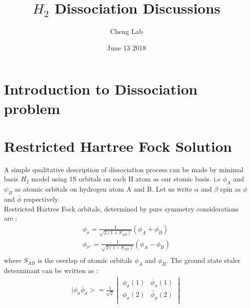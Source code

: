 \documentclass[11pt]{article}   	%
\begin{document}
\title{$H_2$ Dissociation Discussions}
\author{Cheng Lab}
\date{June 13 2018}							%
\maketitle
\section{Introduction to Dissociation problem}
\section{Restricted Hartree Fock Solution}
	A simple qualitative description of dissociation process can be made by minimal basis $H_2$ model using 1S orbitals on each H atom as our stomic basis.
	i.e $\phi_A$ and $\psi_B$ as atomic orbitals on hydrogen atom A and B. Let us write $\alpha$ and $\beta$ spin as $\phi$ and $\bar{\phi}$ respectively. \\
	Restricted Hartree Fock orbitals, determined by pure symmetry considerations are :\\ 
	\begin{equation}
	\begin{split}
	\phi_{\sigma}=\frac{1}{\sqrt{2(1+S_{AB})}}(\phi_A+\phi_B) \\	
	\phi_{\sigma^*}=\frac{1}{\sqrt{2(1-S_{AB})}}(\phi_A-\phi_B) \\
	\end{split}
	\end{equation}
	where $S_{AB}$ is the overlap of atomic orbitals $\phi_A$ and $\phi_B$. The ground state staler determinant can be written as :\\
	\begin{equation}
	\begin{split}
	|\phi_{\sigma}\bar{\phi}_{\sigma}>=\frac{1}{\sqrt{2}} \begin{vmatrix}\phi_{\sigma}(1) 
	& \bar{\phi}_{\sigma}(1) \\  \phi_{\sigma}(2) & \bar{\phi}_{\sigma}(2) \\ \end{vmatrix}  \\
	\end{split}
	\end{equation}
	
\end{document}
